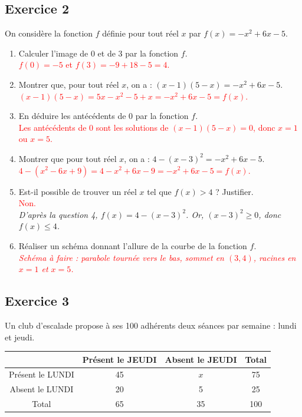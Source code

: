 \documentclass[11pt,a4paper]{article}
\newcommand{\reponse}[1]{\textcolor{red}{#1}}
\begin{document}
\subsection*{Exercice 2}
On considère la fonction $f$ définie pour tout réel $x$ par $f(x) = -x^2 + 6x - 5$.

\begin{enumerate}
    \item Calculer l'image de 0 et de 3 par la fonction $f$. \\
    \reponse{$f(0) = -5$ et $f(3) = -9 + 18 - 5 = 4$.}

    \item Montrer que, pour tout réel $x$, on a : $(x - 1)(5 - x) = -x^2 + 6x - 5$. \\
    \reponse{$(x - 1)(5 - x) = 5x - x^2 - 5 + x = -x^2 + 6x - 5 = f(x)$.}

    \item En déduire les antécédents de 0 par la fonction $f$. \\
    \reponse{Les antécédents de 0 sont les solutions de $(x - 1)(5 - x) = 0$, donc $x = 1$ ou $x = 5$.}

    \item Montrer que pour tout réel $x$, on a : $4 - (x - 3)^2 = -x^2 + 6x - 5$. \\
    \reponse{$4 - (x^2 - 6x + 9) = 4 - x^2 + 6x - 9 = -x^2 + 6x - 5 = f(x)$.}

    \item Est-il possible de trouver un réel $x$ tel que $f(x) > 4$ ? Justifier. \\
    \reponse{Non.} \\
    \textit{D'après la question 4, $f(x) = 4 - (x - 3)^2$. Or, $(x - 3)^2 \geq 0$, donc $f(x) \leq 4$.}

    \item Réaliser un schéma donnant l'allure de la courbe de la fonction $f$. \\
    \reponse{\textit{Schéma à faire : parabole tournée vers le bas, sommet en $(3, 4)$, racines en $x = 1$ et $x = 5$.}}
\end{enumerate}

\subsection*{Exercice 3}
Un club d'escalade propose à ses 100 adhérents deux séances par semaine : lundi et jeudi.

\begin{center}
\begin{tabular}{|c|c|c|c|}
\hline
 & Présent le JEUDI & Absent le JEUDI & Total \\
\hline
Présent le LUNDI & 45 & $x$ & 75 \\
\hline
Absent le LUNDI & 20 & 5 & 25 \\
\hline
Total & 65 & 35 & 100 \\
\hline
\end{tabular}
\end{center}
\end{document}
